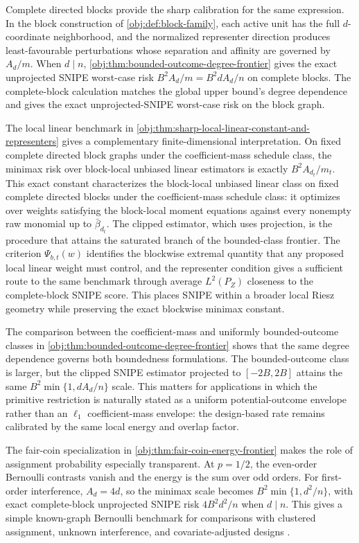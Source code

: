 Complete directed blocks provide the sharp calibration for the same expression. In the block construction of \cref{obj:def:block-family}, each active unit has the full \(d\)-coordinate neighborhood, and the normalized representer direction produces least-favourable perturbations whose separation and affinity are governed by \(A_d/m\). When \(d\mid n\), \cref{obj:thm:bounded-outcome-degree-frontier} gives the exact unprojected SNIPE worst-case risk \(B^2A_d/m=B^2dA_d/n\) on complete blocks. The complete-block calculation matches the global upper bound's degree dependence and gives the exact unprojected-SNIPE worst-case risk on the block graph.

The local linear benchmark in \cref{obj:thm:sharp-local-linear-constant-and-representers} gives a complementary finite-dimensional interpretation. On fixed complete directed block graphs under the coefficient-mass schedule class, the minimax risk over block-local unbiased linear estimators is exactly \(B^2A_{d_t}/m_t\). This exact constant characterizes the block-local unbiased linear class on fixed complete directed blocks under the coefficient-mass schedule class: it optimizes over weights satisfying the block-local moment equations against every nonempty raw monomial up to \(\bar\beta_{d_t}\). The clipped estimator, which uses projection, is the procedure that attains the saturated branch of the bounded-class frontier. The criterion \(\Psi_{b,t}(w)\) identifies the blockwise extremal quantity that any proposed local linear weight must control, and the representer condition gives a sufficient route to the same benchmark through average \(L^2(P_Z)\) closeness to the complete-block SNIPE score. This places SNIPE within a broader local Riesz geometry while preserving the exact blockwise minimax constant.

The comparison between the coefficient-mass and uniformly bounded-outcome classes in \cref{obj:thm:bounded-outcome-degree-frontier} shows that the same degree dependence governs both boundedness formulations. The bounded-outcome class is larger, but the clipped SNIPE estimator projected to \([-2B,2B]\) attains the same \(B^2\min\{1,dA_d/n\}\) scale. This matters for applications in which the primitive restriction is naturally stated as a uniform potential-outcome envelope rather than an \(\ell_1\) coefficient-mass envelope: the design-based rate remains calibrated by the same local energy and overlap factor.

The fair-coin specialization in \cref{obj:thm:fair-coin-energy-frontier} makes the role of assignment probability especially transparent. At \(p=1/2\), the even-order Bernoulli contrasts vanish and the energy is the sum over odd orders. For first-order interference, \(A_d=4d\), so the minimax scale becomes \(B^2\min\{1,d^2/n\}\), with exact complete-block unprojected SNIPE risk \(4B^2d^2/n\) when \(d\mid n\). This gives a simple known-graph Bernoulli benchmark for comparisons with clustered assignment, unknown interference, and covariate-adjusted designs \citep{EichhornKhanUganderYu2026,WangLi2026}.

